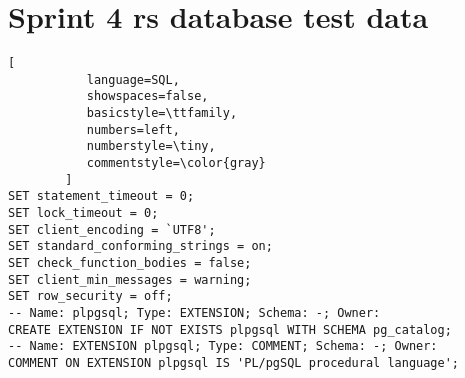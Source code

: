 \chapter{Sprint 4 \gls{rs} database test data}
\label{app:datadump}
\begin{lstlisting}[
           language=SQL,
           showspaces=false,
           basicstyle=\ttfamily,
           numbers=left,
           numberstyle=\tiny,
           commentstyle=\color{gray}
        ]
SET statement_timeout = 0;
SET lock_timeout = 0;
SET client_encoding = `UTF8';
SET standard_conforming_strings = on;
SET check_function_bodies = false;
SET client_min_messages = warning;
SET row_security = off;
-- Name: plpgsql; Type: EXTENSION; Schema: -; Owner: 
CREATE EXTENSION IF NOT EXISTS plpgsql WITH SCHEMA pg_catalog;
-- Name: EXTENSION plpgsql; Type: COMMENT; Schema: -; Owner: 
COMMENT ON EXTENSION plpgsql IS 'PL/pgSQL procedural language';


\end{lstlisting}
